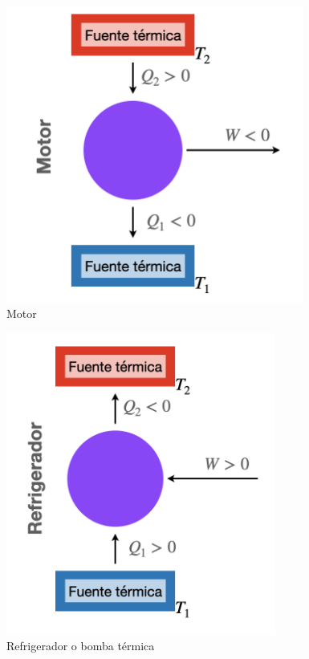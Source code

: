 \begin{minipage}{0.5\textwidth}%
\begin{figure}[H]
    \centering
    \includegraphics[width=0.87\textwidth]{img/motor_carnot.png}
    \caption{Motor}
    \label{fig:motor}
\end{figure}
\end{minipage}%
\begin{minipage}{0.5\textwidth}%
\begin{figure}[H]
    \centering
    \includegraphics[width=0.79\textwidth]{img/refrigerador.png}
    \caption{Refrigerador o bomba térmica}
    \label{fig:refrigerador}
\end{figure}
\end{minipage}%
\hfill\\


